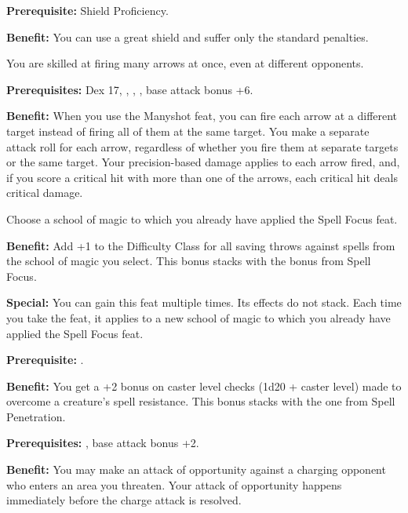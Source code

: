 
\textbf{Prerequisite:} Shield Proficiency.

\textbf{Benefit:} You can use a great shield and suffer only the standard penalties.


You are skilled at firing many arrows at once, even at different opponents.

\textbf{Prerequisites:} Dex 17, , , , base attack bonus +6.

\textbf{Benefit:} When you use the Manyshot feat, you can fire each arrow at a different target instead of firing all of them at the same target. You make a separate attack roll for each arrow, regardless of whether you fire them at separate targets or the same target. Your precision-based damage applies to each arrow fired, and, if you score a critical hit with more than one of the arrows, each critical hit deals critical damage.


Choose a school of magic to which you already have applied the Spell Focus feat.

\textbf{Benefit:} Add +1 to the Difficulty Class for all saving throws against spells from the school of magic you select. This bonus stacks with the bonus from Spell Focus.

\textbf{Special:} You can gain this feat multiple times. Its effects do not stack. Each time you take the feat, it applies to a new school of magic to which you already have applied the Spell Focus feat.


\textbf{Prerequisite:} .

\textbf{Benefit:} You get a +2 bonus on caster level checks (1d20 + caster level) made to overcome a creature's spell resistance. This bonus stacks with the one from Spell Penetration.


\textbf{Prerequisites:} , base attack bonus +2.

\textbf{Benefit:} You may make an attack of opportunity against a charging opponent who enters an area you threaten.  Your attack of opportunity happens immediately before the charge attack is resolved.

